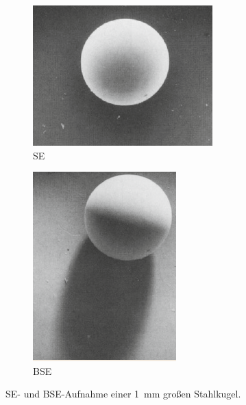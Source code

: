 \begin{figure}[!ht]
    \centering
    \begin{subfigure}{0.505\textwidth}
        \centering
        \includegraphics[width=\textwidth]{img/se-example}
    \caption{SE}
    \end{subfigure}
    \begin{subfigure}{0.3\textwidth}
        \centering
        \includegraphics[width=\textwidth]{img/bse-example}
        \caption{BSE}
    \end{subfigure}
    \caption{
     SE- und BSE-Aufnahme einer \SI{1}{mm} großen Stahlkugel. \cite{springer-handbook}
    }
    \label{fig:bse-schatten}
\end{figure}

